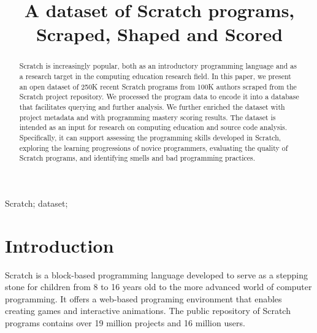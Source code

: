 \documentclass[10pt, conference]{IEEEtran}
\begin{document}
\title{A dataset of Scratch programs,\\Scraped, Shaped and Scored}


\author{
	
}

\maketitle


\begin{abstract}
Scratch is increasingly popular, both as an introductory programming language and as a research target in the computing education research field.	
In this paper, we present an open dataset of 250K recent Scratch programs from 100K authors scraped from the Scratch project repository.
We processed the program data to encode it into a database that facilitates querying and further analysis. We further enriched the dataset with project metadata and with programming mastery scoring results.
The dataset is intended as an input for research on computing education and source code analysis.
Specifically, it can support assessing the programming skills developed in Scratch, exploring the learning progressions of novice programmers, evaluating the quality of Scratch programs, and identifying smells and bad programming practices.
\end{abstract}

\begin{IEEEkeywords}
Scratch; dataset;
\end{IEEEkeywords}


 
\section{Introduction}
Scratch \cite{resnick_scratch:_2009} is a block-based programming language developed to serve as a stepping stone for children from 8 to 16 years old to the more advanced world of computer programming.
It offers a web-based programing environment that enables creating games and interactive animations. The public repository of Scratch programs contains over 19 million projects and 16 million users.
\end{document}
